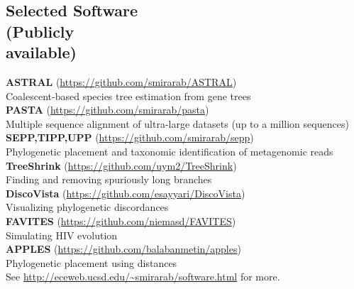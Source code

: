 \documentclass[margin,line,letterpaper]{resume}
\begin{document}
\begin{resume}
\section{\mysidestyle Selected Software\\(Publicly\\available)}
\textbf{ASTRAL} (\url{https://github.com/smirarab/ASTRAL})\\
Coalescent-based species tree estimation from  gene trees\vspace{2mm}\\
\textbf{PASTA} (\url{https://github.com/smirarab/pasta})\\ 
Multiple sequence alignment of ultra-large datasets (up to a million sequences)\vspace{2mm}\\
\textbf{SEPP,TIPP,UPP} (\url{https://github.com/smirarab/sepp})\\
Phylogenetic placement and taxonomic identification of metagenomic reads\vspace{2mm}\\
\textbf{TreeShrink} (\url{https://github.com/uym2/TreeShrink})\\
Finding and removing spuriously long branches\vspace{2mm}\\
\textbf{DiscoVista} (\url{https://github.com/esayyari/DiscoVista})\\
Visualizing phylogenetic discordances\vspace{2mm}\\
\textbf{FAVITES} (\url{https://github.com/niemasd/FAVITES})\\
Simulating HIV evolution\vspace{2mm}\\
\textbf{APPLES} (\url{https://github.com/balabanmetin/apples})\\
Phylogenetic placement using distances\vspace{2mm}\\
See \url{http://eceweb.ucsd.edu/~smirarab/software.html} for more. 

\end{resume}
\end{document}

